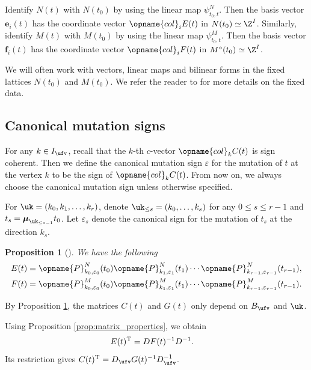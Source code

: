 \documentclass[pdftex]{sigma}
\newcommand{\Mc}{M^\circ}
\newcommand{\col}{\opname{col}}
\newcommand{\seq}{\boldsymbol{\mu}}%
\newcommand{\trans}{\opname{P}}
\newcommand{\ee}{\mathbf{e}}
\newcommand{\ff}{\mathbf{f}}
\numberwithin{equation}{section}
\newtheorem{Proposition}[Theorem]{Proposition}
 { \theoremstyle{definition}
\newtheorem{Definition}[Theorem]{Definition}
\newtheorem{Note}[Theorem]{Note}
\newtheorem{Example}[Theorem]{Example}
\newtheorem{Remark}[Theorem]{Remark}
\newtheorem{Assumption}[Theorem]{Assumption}
}
\begin{document}
Identify $N(t)$ with $N(t_{0})$ by using the linear map $\psi_{t_{0},t}^{N}$.
Then the basis vector $\ee_{i}(t)$ has the coordinate vector $\col_{i}E(t)$
in $N(t_{0})\simeq\Z^{I}$. Similarly, identify $M(t)$ with $M(t_{0})$
by using the linear map $\psi_{t_{0},t}^{M}$. Then the basis vector
$\ff_{i}(t)$ has the coordinate vector $\col_{i}F(t)$ in $\Mc(t_{0})\simeq\Z^{I}$.

We will often work with vectors, linear maps and bilinear forms in
the fixed lattices $N(t_{0})$ and $M(t_{0})$. We refer the reader
to \cite{gross2013birational} for more details on the fixed data.

\subsection{Canonical mutation signs}

For any $k\in I_{\ufv}$, recall that the $k$-th $c$-vector $\col_{k}C(t)$
is sign coherent. Then we define the canonical mutation sign $\varepsilon$
for the mutation of $t$ at the vertex $k$ to be the sign of $\col_{k}C(t)$.
From now on, we always choose the canonical mutation sign unless otherwise
specified.

For $\uk=(k_{0},k_{1},\ldots,k_{r})$, denote $\uk_{\leq s}=(k_{0},\ldots,k_{s})$
for any $0\leq s\leq r-1$ and $t_{s}=\seq_{\uk_{\leq s-1}}t_{0}$.
Let $\varepsilon_{s}$ denote the canonical sign for the mutation
of $t_{s}$ at the direction $k_{s}$.

\begin{Proposition}[{\cite{gross2018canonical,nakanishi2012tropical}}]\label{prop:recursive_bases}
We have the following
\begin{gather*}%
E(t) =\trans_{k_0,\varepsilon_{0}}^{N}(t_{0})\trans_{k_1,\varepsilon_{1}}^{N}(t_{1})\cdots\trans_{k_{r-1},\varepsilon_{r-1}}^{N}(t_{r-1}),\\
F(t) =\trans_{k_0,\varepsilon_{0}}^{M}(t_{0})\trans_{k_1,\varepsilon_{1}}^{M}(t_{1})\cdots\trans_{k_{r-1},\varepsilon_{r-1}}^{M}(t_{r-1}).
\end{gather*}
\end{Proposition}
By Proposition \ref{prop:recursive_bases}, the matrices $C(t)$ and $G(t)$ only depend on $B_{\ufv}$
and $\uk$.

Using Proposition \ref{prop:matrix_properties}, we obtain
\begin{align}
E(t)^{\rm T}=DF(t)^{-1}D^{-1} &.\label{eq:E_D_F_relation}
\end{align}
Its restriction gives $C(t)^{\rm T}=D_{\ufv}G(t)^{-1}D_{\ufv}^{-1}$.
\end{document}
